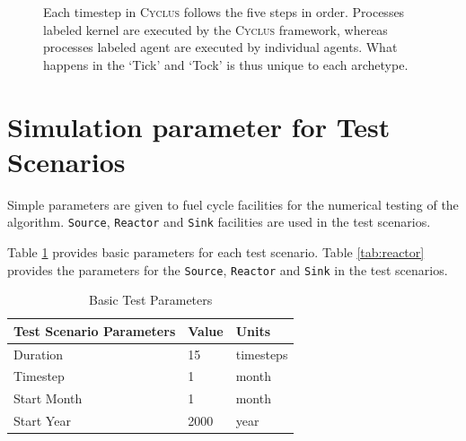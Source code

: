 \documentclass[11pt,letterpaper]{article}
\newcommand{\Cyclus}{\textsc{Cyclus}\xspace}%
\begin{document}
\begin{figure}[H]
\centering
{}
\caption{Each timestep in \Cyclus follows the five steps in order. Processes labeled
         kernel are executed by the \Cyclus framework, whereas processes labeled agent
         are executed by individual agents. What happens in the `Tick' and `Tock' is
         thus unique to each archetype.}
\label{diag:time}
\end{figure}

\section{Simulation parameter for Test Scenarios}
Simple parameters are given to fuel cycle facilities for the numerical testing of 
the algorithm.  \texttt{Source}, \texttt{Reactor} and \texttt{Sink} facilities are used in the test scenarios. 

Table \ref{tab:testscenario} provides basic parameters for each test scenario. 
Table \ref{tab:reactor} provides the parameters for the \texttt{Source},
\texttt{Reactor} and \texttt{Sink} in the test scenarios.

\begin{table}[H]
	\centering
	\caption {Basic Test Parameters}
	\label{tab:testscenario}
	\begin{tabular}{|l|l|l|}
		\hline
		\textbf{Test Scenario Parameters} & \textbf{Value} & \textbf{Units} \\
		\hline
		Duration & 15 & timesteps \\
		Timestep & 1 & month \\
		Start Month & 1 & month \\
		Start Year & 2000 & year \\
		\hline
	\end{tabular}
\end{table}
\end{document}
